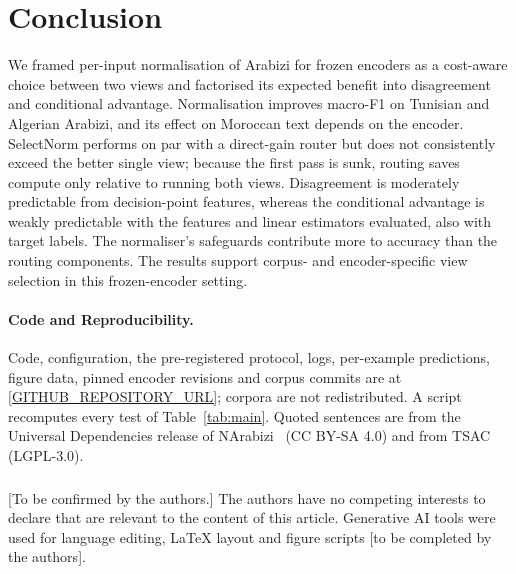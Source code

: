 \section{Conclusion}
\label{sec:conclusion}
We framed per-input normalisation of Arabizi for frozen encoders as a cost-aware choice between two views and factorised its expected benefit into disagreement and conditional advantage. Normalisation improves macro-F1 on Tunisian and Algerian Arabizi, and its effect on Moroccan text depends on the encoder. SelectNorm performs on par with a direct-gain router but does not consistently exceed the better single view; because the first pass is sunk, routing saves compute only relative to running both views. Disagreement is moderately predictable from decision-point features, whereas the conditional advantage is weakly predictable with the features and linear estimators evaluated, also with target labels. The normaliser's safeguards contribute more to accuracy than the routing components. The results support corpus- and encoder-specific view selection in this frozen-encoder setting.

\paragraph{Code and Reproducibility.}
Code, configuration, the pre-registered protocol, logs, per-example predictions, figure data, pinned encoder revisions and corpus commits are at \url{[GITHUB_REPOSITORY_URL]}; corpora are not redistributed. A script recomputes every test of Table~\ref{tab:main}. Quoted sentences are from the Universal Dependencies release of NArabizi~\cite{seddah2020narabizi} (CC BY-SA 4.0) and from TSAC~\cite{medhaffar2017tsac} (LGPL-3.0).

\begin{credits}
\subsubsection{\discintname}
[To be confirmed by the authors.] The authors have no competing interests to declare that are relevant to the content of this article. Generative AI tools were used for language editing, LaTeX layout and figure scripts [to be completed by the authors].
\end{credits}
